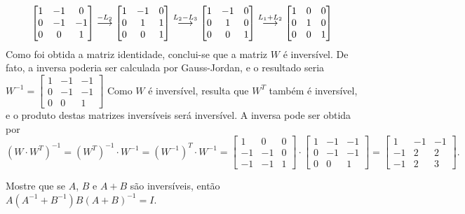 \documentclass[12pt,a4paper]{article}
\newcommand{\grstep}[2][\relax]{%
   \ensuremath{\mathrel{
       {\mathop{\longrightarrow}\limits^{#2\mathstrut}_{
                                     \begin{subarray}{l} #1 \end{subarray}}}}}}
\begin{document}
\begin{ExerciseList}
\begin{enumerate}
\begin{align*}
\begin{bmatrix}
1 & -1 & 0 \\
0 & -1 & -1 \\
0 & 0 & 1
\end{bmatrix}
\grstep{ -L_2 }
\begin{bmatrix}
1 & -1 & 0 \\
0 & 1 & 1 \\
0 & 0 & 1
\end{bmatrix}
\grstep{ L_2 - L_3 }
\begin{bmatrix}
1 & -1 & 0 \\
0 & 1 & 0 \\
0 & 0 & 1
\end{bmatrix}
\grstep{ L_1 + L_2 }
\begin{bmatrix}
1 & 0 & 0 \\
0 & 1 & 0 \\
0 & 0 & 1
\end{bmatrix}
\end{align*}
Como foi obtida a matriz identidade, conclui-se que a matriz $W$ é inversível. De fato, a inversa poderia ser calculada por Gauss-Jordan, e o resultado seria $W^{-1} = \begin{bmatrix}
1 & -1 & -1 \\
0 & -1 & -1 \\
0 &  0 &  1
\end{bmatrix}$
Como $W$ é inversível, resulta que $W^T$ também é inversível, e o produto destas matrizes inversíveis será inversível. A inversa pode ser obtida por
{\footnotesize
\[
  (W \cdot W^T)^{-1}
= (W^T)^{-1} \cdot W^{-1}
= (W^{-1})^T \cdot W^{-1}
= \begin{bmatrix}
 1 &  0 & 0 \\
-1 & -1 & 0 \\
-1 & -1 & 1
\end{bmatrix}
\cdot
\begin{bmatrix}
1 & -1 & -1 \\
0 & -1 & -1 \\
0 &  0 &  1
\end{bmatrix}
=
\begin{bmatrix}
1 & -1 & -1 \\
-1 & 2 & 2 \\
-1 & 2 & 3
\end{bmatrix}.
\]
}

\end{enumerate}


\Exercise[title={1,8}] Mostre que se $A$, $B$ e $A+B$ são inversíveis, então $A(A^{-1}+B^{-1})B(A+B)^{-1} = I$.


\end{ExerciseList}
\end{document}
